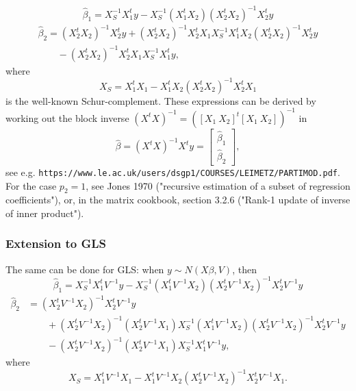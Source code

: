 \documentclass[12pt]{article}
\begin{document}
\begin{equation}
\hat \beta_1 = X_S^{-1} X_1^t y   - X_S^{-1} (X_1^t X_2) (X_2^t X_2)^{-1} X_2^t y
\end{equation}
\begin{equation}
\begin{split}
\hat \beta_2 = (X_2^t X_2)^{-1} X_2^t y + (X_2^t X_2)^{-1} X_2^t X_1 X_S^{-1} X_1^t X_2 (X_2^t X_2)^{-1} X_2^t y \\
\quad \quad - (X_2^t X_2)^{-1} X_2^t X_1 X_S^{-1} X_1^t  y,
\end{split}
\end{equation}
%
where 
\begin{equation}
X_S = X_1^t X_1 - X_1^t X_2 (X_2^t X_2)^{-1} X_2^t X_1
\end{equation}
is the well-known Schur-complement. These expressions can be derived by working out the block inverse $(X^t X)^{-1} = ([X_1 \: X_2]^t [X_1 \: X_2])^{-1}$ in
%
\begin{equation}
\hat \beta = (X^t X)^{-1} X^t y = \left[\begin{array}{c}
\hat \beta_1 \\
\hat \beta_2
\end{array}
\right],
\end{equation}
see e.g. \verb|https://www.le.ac.uk/users/dsgp1/COURSES/LEIMETZ/PARTIMOD.pdf|.
For the case $p_2=1$, see Jones 1970 ("recursive estimation of a subset of regression coefficients"), or, in the matrix cookbook, section 3.2.6 ("Rank-1 update of inverse of inner product"). 

\subsubsection{Extension to GLS} \label{gls}

The same can be done for GLS: when $y \sim N(X \beta, V)$, then 
\begin{equation} \label{gls2}
\hat \beta_1 = X_S^{-1} X_1^t V^{-1} y   - X_S^{-1} (X_1^t V^{-1} X_2) (X_2^t V^{-1} X_2)^{-1} X_2^t V^{-1} y
\end{equation}
\begin{equation}\label{gls3}
\begin{split}
\hat \beta_2 & = (X_2^t V^{-1} X_2)^{-1} X_2^t V^{-1} y \\
&\qquad  + (X_2^t V^{-1} X_2)^{-1} (X_2^t V^{-1} X_1) X_S^{-1} (X_1^t V^{-1} X_2) (X_2^t V^{-1} X_2)^{-1} X_2^t V^{-1} y \\
&\qquad  - (X_2^t V^{-1} X_2)^{-1} (X_2^t V^{-1} X_1) X_S^{-1} X_1^t V^{-1} y,
\end{split}
\end{equation}
%
where 
\begin{equation} \label{gls4}
X_S = X_1^t V^{-1} X_1 - X_1^t V^{-1} X_2 (X_2^t V^{-1} X_2)^{-1} X_2^t V^{-1} X_1.
\end{equation}
\end{document}
